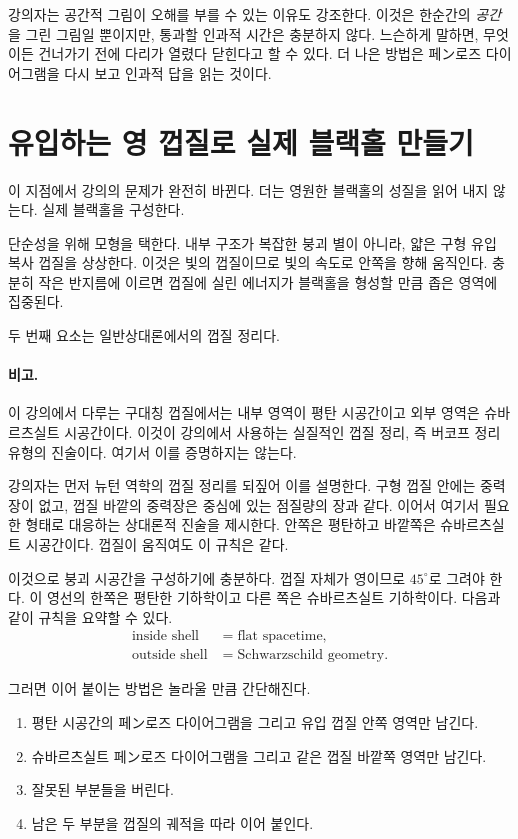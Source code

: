 강의자는 공간적 그림이 오해를 부를 수 있는 이유도 강조한다. 이것은 한순간의 \emph{공간}을 그린 그림일 뿐이지만, 통과할 인과적 시간은 충분하지 않다. 느슨하게 말하면, 무엇이든 건너가기 전에 다리가 열렸다 닫힌다고 할 수 있다. 더 나은 방법은 페ン로즈 다이어그램을 다시 보고 인과적 답을 읽는 것이다.

\section{유입하는 영 껍질로 실제 블랙홀 만들기}

이 지점에서 강의의 문제가 완전히 바뀐다. 더는 영원한 블랙홀의 성질을 읽어 내지 않는다. 실제 블랙홀을 구성한다.

단순성을 위해 모형을 택한다. 내부 구조가 복잡한 붕괴 별이 아니라, 얇은 구형 유입 복사 껍질을 상상한다. 이것은 빛의 껍질이므로 빛의 속도로 안쪽을 향해 움직인다. 충분히 작은 반지름에 이르면 껍질에 실린 에너지가 블랙홀을 형성할 만큼 좁은 영역에 집중된다.

두 번째 요소는 일반상대론에서의 껍질 정리다.

\paragraph{비고.} 이 강의에서 다루는 구대칭 껍질에서는 내부 영역이 평탄 시공간이고 외부 영역은 슈바르츠실트 시공간이다. 이것이 강의에서 사용하는 실질적인 껍질 정리, 즉 버코프 정리 유형의 진술이다. 여기서 이를 증명하지는 않는다.

강의자는 먼저 뉴턴 역학의 껍질 정리를 되짚어 이를 설명한다. 구형 껍질 안에는 중력장이 없고, 껍질 바깥의 중력장은 중심에 있는 점질량의 장과 같다. 이어서 여기서 필요한 형태로 대응하는 상대론적 진술을 제시한다. 안쪽은 평탄하고 바깥쪽은 슈바르츠실트 시공간이다. 껍질이 움직여도 이 규칙은 같다.

이것으로 붕괴 시공간을 구성하기에 충분하다. 껍질 자체가 영이므로 \(45^\circ\)로 그려야 한다. 이 영선의 한쪽은 평탄한 기하학이고 다른 쪽은 슈바르츠실트 기하학이다. 다음과 같이 규칙을 요약할 수 있다.
\begin{equation}
\begin{aligned}
\text{inside shell} &= \text{flat spacetime},\\
\text{outside shell} &= \text{Schwarzschild geometry}.
\end{aligned}
\end{equation}

그러면 이어 붙이는 방법은 놀라울 만큼 간단해진다.

\begin{enumerate}
\item 평탄 시공간의 페ン로즈 다이어그램을 그리고 유입 껍질 안쪽 영역만 남긴다.
\item 슈바르츠실트 페ン로즈 다이어그램을 그리고 같은 껍질 바깥쪽 영역만 남긴다.
\item 잘못된 부분들을 버린다.
\item 남은 두 부분을 껍질의 궤적을 따라 이어 붙인다.
\end{enumerate}

